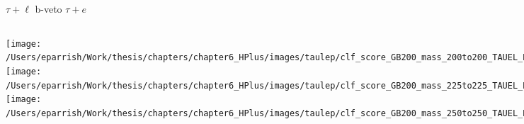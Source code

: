 \documentclass[aspectratio=169,xcolor=table]{beamer}
\begin{document}
    \begin{frame}[t]{$\tau+\ell$ b-veto $\tau+e$}
      \begin{columns}[t]
          \texttt{[image: /Users/eparrish/Work/thesis/chapters/chapter6\_HPlus/images/taulep/clf\_score\_GB200\_mass\_200to200\_TAUEL\_BVETO.png]}
          \texttt{[image: /Users/eparrish/Work/thesis/chapters/chapter6\_HPlus/images/taulep/clf\_score\_GB200\_mass\_225to225\_TAUEL\_BVETO.png]}
          \texttt{[image: /Users/eparrish/Work/thesis/chapters/chapter6\_HPlus/images/taulep/clf\_score\_GB200\_mass\_250to250\_TAUEL\_BVETO.png]}

          \texttt{[image: /Users/eparrish/Work/thesis/chapters/chapter6\_HPlus/images/taulep/clf\_score\_GB200\_mass\_275to275\_TAUEL\_BVETO.png]}
          \texttt{[image: /Users/eparrish/Work/thesis/chapters/chapter6\_HPlus/images/taulep/clf\_score\_GB200\_mass\_300to300\_TAUEL\_BVETO.png]}
          \texttt{[image: /Users/eparrish/Work/thesis/chapters/chapter6\_HPlus/images/taulep/clf\_score\_GB200\_mass\_350to350\_TAUEL\_BVETO.png]}

          \texttt{[image: /Users/eparrish/Work/thesis/chapters/chapter6\_HPlus/images/taulep/clf\_score\_GB200\_mass\_400to400\_TAUEL\_BVETO.png]}
          \texttt{[image: /Users/eparrish/Work/thesis/chapters/chapter6\_HPlus/images/taulep/clf\_score\_GB200\_mass\_500to500\_TAUEL\_BVETO.png]}
          \texttt{[image: /Users/eparrish/Work/thesis/chapters/chapter6\_HPlus/images/taulep/clf\_score\_GB200\_mass\_600to600\_TAUEL\_BVETO.png]}

          \texttt{[image: /Users/eparrish/Work/thesis/chapters/chapter6\_HPlus/images/taulep/clf\_score\_GB200\_mass\_700to700\_TAUEL\_BVETO.png]}
          \texttt{[image: /Users/eparrish/Work/thesis/chapters/chapter6\_HPlus/images/taulep/clf\_score\_GB200\_mass\_800to800\_TAUEL\_BVETO.png]}
          \texttt{[image: /Users/eparrish/Work/thesis/chapters/chapter6\_HPlus/images/taulep/clf\_score\_GB200\_mass\_900to900\_TAUEL\_BVETO.png]}

      \end{columns}
    \end{frame}
\end{document}
